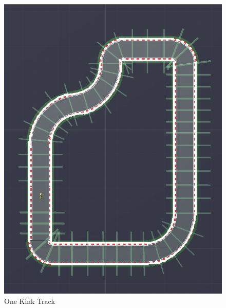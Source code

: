 \begin{figure}[H]
    \centering
    \begin{minipage}[b]{0.45\textwidth}
    \includegraphics[width=\textwidth]{images/tracks/ComplicatedTrack.PNG}
    \caption{One Kink Track}
    \label{fig:onekink}
  \end{minipage}
  \hfill
  \begin{minipage}[b]{0.45\textwidth}

\end{minipage}
\end{figure}
